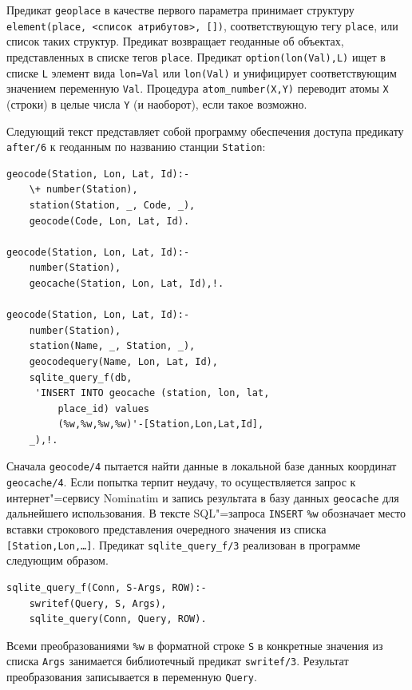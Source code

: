 \documentclass[a4paper,14pt, openany, twoside, draft]{extbook} %
\begin{document}
Предикат \texttt{geoplace} в качестве первого параметра принимает структуру \texttt{element(place, <список атрибутов>, [])}, соответствующую тегу \texttt{place}, или список таких структур.  Предикат возвращает геоданные об объектах, представленных в списке тегов \texttt{place}.  Предикат \texttt{option(lon(Val),L)} ищет в списке \texttt{L} элемент вида \texttt{lon=Val} или \texttt{lon(Val)} и унифицирует соответствующим значением переменную \texttt{Val}.  Процедура \texttt{atom\_number(X,Y)} переводит атомы \texttt{X} (строки) в целые числа \texttt{Y} (и наоборот), если такое возможно.

Следующий текст представляет собой программу обеспечения доступа предикату \texttt{after/6} к геоданным по названию станции \texttt{Station}:

\begin{verbatim}
geocode(Station, Lon, Lat, Id):-
    \+ number(Station),
    station(Station, _, Code, _),
    geocode(Code, Lon, Lat, Id).

geocode(Station, Lon, Lat, Id):-
    number(Station),
    geocache(Station, Lon, Lat, Id),!.

geocode(Station, Lon, Lat, Id):-
    number(Station),
    station(Name, _, Station, _),
    geocodequery(Name, Lon, Lat, Id),
    sqlite_query_f(db,
     'INSERT INTO geocache (station, lon, lat,
         place_id) values
         (%w,%w,%w,%w)'-[Station,Lon,Lat,Id],
    _),!.
\end{verbatim}


Сначала \texttt{geocode/4} пытается найти данные в локальной базе данных координат \texttt{geocache/4}.  Если попытка терпит неудачу, то осуществляется запрос к интернет"=сервису \foreignlanguage{latin}{Nominatim} и запись результата в базу данных \texttt{geocache} для дальнейшего использования.  В тексте SQL"=запроса \texttt{INSERT} \texttt{\%w} обозначает место вставки строкового представления очередного значения из списка \texttt{[Station,Lon,\ldots]}.  Предикат \texttt{sqlite\_query\_f/3} реализован в программе следующим образом.

\begin{verbatim}
sqlite_query_f(Conn, S-Args, ROW):-
    swritef(Query, S, Args),
    sqlite_query(Conn, Query, ROW).
\end{verbatim}

Всеми преобразованиями \texttt{\%w} в форматной строке \texttt{S} в конкретные значения из списка \texttt{Args} занимается библиотечный предикат \texttt{swritef/3}.  Результат преобразования записывается в переменную \texttt{Query}.
\end{document}
